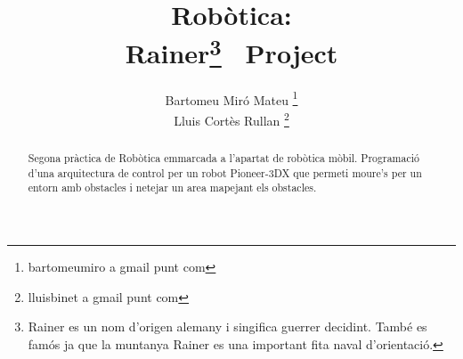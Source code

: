 \documentclass[a4paper,11pt]{scrartcl}
\title{Robòtica: \\ Rainer\footnote{Rainer es un nom d'origen alemany i singifica guerrer decidint. També es famós ja que la muntanya Rainer es una important fita naval d'orientació.} \ Project}
\author{ Bartomeu Miró Mateu \thanks{bartomeumiro a gmail punt com} \\
	 Lluis Cortès Rullan \thanks{lluisbinet a gmail punt com} }
\begin{document}
  \maketitle

  \begin{abstract}
    Segona pràctica de Robòtica emmarcada a l'apartat de robòtica mòbil.
    Programació d'una arquitectura de control per un robot Pioneer-3DX que
    permeti moure’s per un entorn amb obstacles i netejar un area mapejant
    els obstacles.
  \end{abstract}

  \newpage
  \setcounter{page}{2}
  \tableofcontents
  \newpage

  
  
  
  
  
  
  
\end{document}
